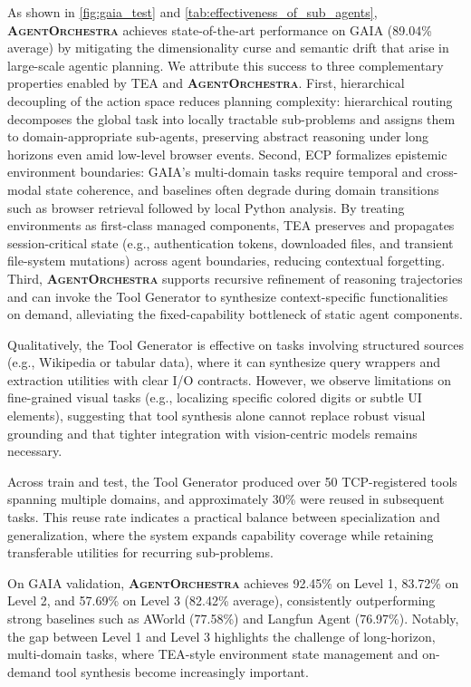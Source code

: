 \documentclass[11pt]{article}
\newcommand{\projectname}{\textbf{\textsc{AgentOrchestra}}\xspace}
\begin{document}
As shown in \cref{fig:gaia_test} and \cref{tab:effectiveness_of_sub_agents}, \projectname achieves state-of-the-art performance on GAIA (89.04\% average) by mitigating the dimensionality curse and semantic drift that arise in large-scale agentic planning. We attribute this success to three complementary properties enabled by TEA and \projectname. First, hierarchical decoupling of the action space reduces planning complexity: hierarchical routing decomposes the global task into locally tractable sub-problems and assigns them to domain-appropriate sub-agents, preserving abstract reasoning under long horizons even amid low-level browser events. Second, ECP formalizes epistemic environment boundaries: GAIA's multi-domain tasks require temporal and cross-modal state coherence, and baselines often degrade during domain transitions such as browser retrieval followed by local Python analysis. By treating environments as first-class managed components, TEA preserves and propagates session-critical state (e.g., authentication tokens, downloaded files, and transient file-system mutations) across agent boundaries, reducing contextual forgetting. Third, \projectname supports recursive refinement of reasoning trajectories and can invoke the Tool Generator to synthesize context-specific functionalities on demand, alleviating the fixed-capability bottleneck of static agent components.

Qualitatively, the Tool Generator is effective on tasks involving structured sources (e.g., Wikipedia or tabular data), where it can synthesize query wrappers and extraction utilities with clear I/O contracts. However, we observe limitations on fine-grained visual tasks (e.g., localizing specific colored digits or subtle UI elements), suggesting that tool synthesis alone cannot replace robust visual grounding and that tighter integration with vision-centric models remains necessary.

Across train and test, the Tool Generator produced over 50 TCP-registered tools spanning multiple domains, and approximately 30\% were reused in subsequent tasks. This reuse rate indicates a practical balance between specialization and generalization, where the system expands capability coverage while retaining transferable utilities for recurring sub-problems.

On GAIA validation, \projectname achieves 92.45\% on Level 1, 83.72\% on Level 2, and 57.69\% on Level 3 (82.42\% average), consistently outperforming strong baselines such as AWorld (77.58\%) and Langfun Agent (76.97\%). Notably, the gap between Level 1 and Level 3 highlights the challenge of long-horizon, multi-domain tasks, where TEA-style environment state management and on-demand tool synthesis become increasingly important.
\end{document}
